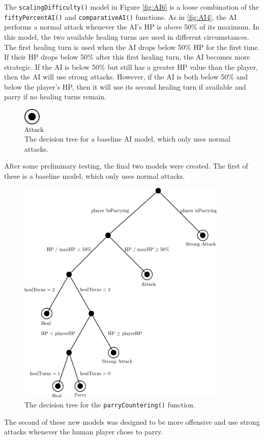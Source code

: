 The \texttt{scalingDifficulty()} model in Figure \ref{fig:AI6} is a loose combination of the \texttt{fiftyPercentAI()} and \texttt{comparativeAI()} functions. As in \ref{fig:AI4}, the AI performs a normal attack whenever the AI's HP is above 50\% of its maximum. In this model, the two available healing turns are used in different circumstances. The first healing turn is used when the AI drops below 50\% HP for the first time. If their HP drops below 50\% after this first healing turn, the AI becomes more strategic. If the AI is below 50\% but still has a greater HP value than the player, then the AI will use strong attacks. However, if the AI is both below 50\% and below the player's HP, then it will use its second healing turn if available and parry if no healing turns remain.\\

\begin{figure}[H]
  \centering
  \includegraphics[width=1cm]{figures/AIAttack.png}
  \caption{The decision tree for a baseline AI model, which only uses normal attacks.}
  \label{fig:AI7}
  \end{figure}

After some preliminary testing, the final two models were created. The first of these is a baseline model, which only uses normal attacks.

\begin{figure}[H]
  \centering
  \includegraphics[width=10cm]{figures/AIParry.png}
  \caption{The decision tree for the \texttt{parryCountering()} function.}
  \label{fig:AI8}
\end{figure}
The second of these new models was designed to be more offensive and use strong attacks whenever the human player chose to parry.\\


